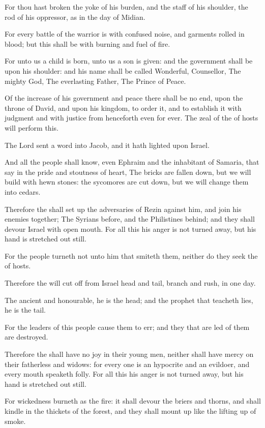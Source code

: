 \verse For thou hast broken the yoke of his burden, and the staff of his shoulder, the rod of his oppressor, as in the day of Midian.

\verse For every battle of the warrior is with confused noise, and garments rolled in blood; but this shall be with burning and fuel of fire.

\verse For unto us a child is born, unto us a son is given: and the government shall be upon his shoulder: and his name shall be called Wonderful, Counsellor, The mighty God, The everlasting Father, The Prince of Peace.

\verse Of the increase of his government and peace there shall be no end, upon the throne of David, and upon his kingdom, to order it, and to establish it with judgment and with justice from henceforth even for ever. The zeal of the \LORD of hosts will perform this.

\verse The Lord sent a word into Jacob, and it hath lighted upon Israel.

\verse And all the people shall know, even Ephraim and the inhabitant of Samaria, that say in the pride and stoutness of heart, \verse The bricks are fallen down, but we will build with hewn stones: the sycomores are cut down, but we will change them into cedars.

\verse Therefore the \LORD shall set up the adversaries of Rezin against him, and join his enemies together; \verse The Syrians before, and the Philistines behind; and they shall devour Israel with open mouth. For all this his anger is not turned away, but his hand is stretched out still.

\verse For the people turneth not unto him that smiteth them, neither do they seek the \LORD of hosts.

\verse Therefore the \LORD will cut off from Israel head and tail, branch and rush, in one day.

\verse The ancient and honourable, he is the head; and the prophet that teacheth lies, he is the tail.

\verse For the leaders of this people cause them to err; and they that are led of them are destroyed.

\verse Therefore the \LORD shall have no joy in their young men, neither shall have mercy on their fatherless and widows: for every one is an hypocrite and an evildoer, and every mouth speaketh folly. For all this his anger is not turned away, but his hand is stretched out still.

\verse For wickedness burneth as the fire: it shall devour the briers and thorns, and shall kindle in the thickets of the forest, and they shall mount up like the lifting up of smoke.

